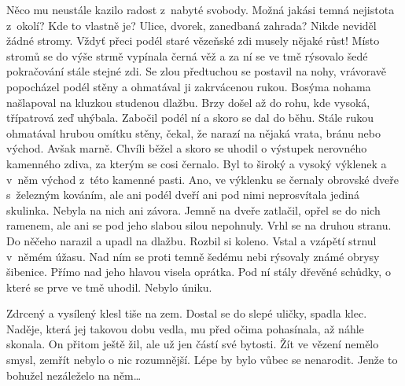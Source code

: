 Něco mu neustále kazilo radost z nabyté svobody. Možná jakási temná nejistota z okolí? Kde to vlastně je? Ulice, dvorek, zanedbaná zahrada? Nikde neviděl žádné stromy. Vždyť přeci podél staré vězeňské zdi musely nějaké růst! Místo stromů se do výše strmě vypínala černá věž a za ní se ve tmě rýsovalo šedé pokračování stále stejné zdi. Se zlou předtuchou se postavil na nohy, vrávoravě popocházel podél stěny a ohmatával ji zakrvácenou rukou. Bosýma nohama našlapoval na kluzkou studenou dlažbu. Brzy došel až do rohu, kde vysoká, třípatrová zeď uhýbala. Zabočil podél ní a skoro se dal do běhu. Stále rukou ohmatával hrubou omítku stěny, čekal, že narazí na nějaká vrata, bránu nebo východ. Avšak marně. Chvíli běžel a skoro se uhodil o výstupek nerovného kamenného zdiva, za kterým se cosi černalo. Byl to široký a vysoký výklenek a v něm východ z této kamenné pasti. Ano, ve výklenku se černaly obrovské dveře s železným kováním, ale ani podél dveří ani pod nimi neprosvítala jediná skulinka. Nebyla na nich ani závora. Jemně na dveře zatlačil, opřel se do nich ramenem, ale ani se pod jeho slabou silou nepohnuly. Vrhl se na druhou stranu. Do něčeho narazil a upadl na dlažbu. Rozbil si koleno. Vstal a vzápětí strnul v němém úžasu. Nad ním se proti temně šedému nebi rýsovaly známé obrysy šibenice. Přímo nad jeho hlavou visela oprátka. Pod ní stály dřevěné schůdky, o které se prve ve tmě uhodil. Nebylo úniku.

Zdrcený a vysílený klesl tiše na zem. Dostal se do slepé uličky, spadla klec. Naděje, která jej takovou dobu vedla, mu před očima pohasínala, až náhle skonala. On přitom ještě žil, ale už jen částí své bytosti. Žít ve vězení nemělo smysl, zemřít nebylo o nic rozumnější. Lépe by bylo vůbec se nenarodit. Jenže to bohužel nezáleželo na něm\ldots

